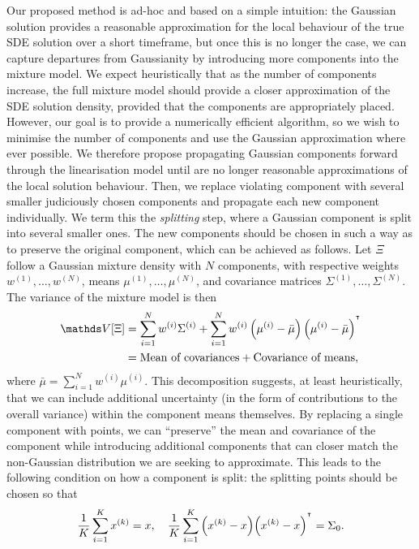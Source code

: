 Our proposed method is ad-hoc and based on a simple intuition: the Gaussian solution provides a reasonable approximation for the local behaviour of the true SDE solution over a short timeframe, but once this is no longer the case, we can capture departures from Gaussianity by introducing more components into the mixture model.
We expect heuristically that as the number of components increase, the full mixture model should provide a closer approximation of the SDE solution density, provided that the components are appropriately placed.
However, our goal is to provide a numerically efficient algorithm, so we wish to minimise the number of components and use the Gaussian approximation where ever possible.
We therefore propose propagating Gaussian components forward through the linearisation model until are no longer reasonable approximations of the local solution behaviour.
Then, we replace violating component with several smaller judiciously chosen components and propagate each new component individually.
We term this the \emph{splitting} step, where a Gaussian component is split into several smaller ones.
The new components should be chosen in such a way as to preserve the original component, which can be achieved as follows.
Let \(\Xi\) follow a Gaussian mixture density with \(N\) components, with respective weights \(w^{(1)}, \dotsc, w^{(N)}\), means \(\mu^{(1)},\dotsc,\mu^{(N)}\), and covariance matrices \(\Sigma^{(1)},\dotsc,\Sigma^{(N)}\).
The variance of the mixture model is then
\begin{align*}
	\var{\Xi} & = \sum_{i=1}^{N}{w^{(i)}\Sigma^{(i)}} + \sum_{i=1}^{N}{w^{(i)}\left(\mu^{(i)} - \bar{\mu}\right)\left(\mu^{(i)} - \bar{\mu}\right)^{\T}} \\
	          & = \text{Mean of covariances} + \text{Covariance of means},
\end{align*}
where \(\bar{\mu} = \sum_{i=1}^{N}{w^{(i)}\mu^{(i)}}\).
This decomposition suggests, at least heuristically, that we can include additional uncertainty (in the form of contributions to the overall variance) within the component means themselves.
By replacing a single component with points, we can ``preserve'' the mean and covariance of the component while introducing additional components that can closer match the non-Gaussian distribution we are seeking to approximate.
This leads to the following condition on how a component is split: the splitting points should be chosen so that
\begin{equation}
	\frac{1}{K}\sum_{i=1}^K{x^{(k)}} = x, \quad \frac{1}{K}\sum_{i=1}^{K}{\left(x^{(k)} - x\right)\!\left(x^{(k)} - x\right)^{^{\intercal}}} = \Sigma_0.
	\label{eqn:cov_split_points}
\end{equation}
